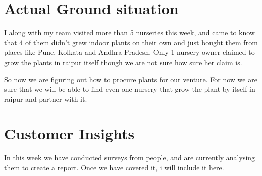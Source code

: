 \documentclass{article}
\begin{document}
\section{Actual Ground situation}

I along with my team visited more than 5 nurseries this week, and came to know that 4 of them didn't grew indoor plants on their own and just bought them from places like Pune, Kolkata and Andhra Pradesh. Only 1 nursery owner claimed to grow the plants in raipur itself though we are not sure how sure her claim is. 

So now we are figuring out how to procure plants for our venture. For now we are sure that we will be able to find even one nursery that grow the plant by itself in raipur and partner with it.


\section{Customer Insights}

In this week we have conducted surveys from people, and are currently analysing them to create a report. Once we have covered it, i will include it here.
\end{document}
